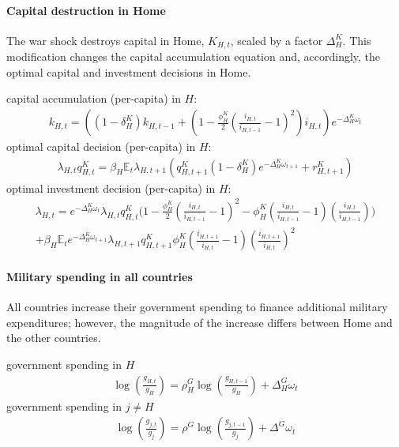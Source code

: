 \paragraph{Capital destruction in Home}
The war shock destroys capital in Home, \(K_{H,t}\), scaled by a factor \(\Delta^{K}_{H}\).
This modification changes the capital accumulation equation
  and, accordingly, the optimal capital and investment decisions in Home.
\begin{tcolorbox}[colback=lightGray, boxrule=1pt, center title, title=\textbf{Capital Destruction}]
capital accumulation (per-capita) in \(H\):
\begin{align*}
k_{H,t} = \left(
  (1-\delta^{K}_{H}) k_{H,t-1}
+ \left( 1 - \frac{\phi^{K}_{H}}{2} {\left(\frac{i_{H,t}}{i_{H,t-1}} - 1 \right)}^2 \right) i_{H,t}
\right) e^{-\Delta^{K}_{H} \omega_{t}}
\end{align*}
optimal capital decision (per-capita) in \(H\):
\begin{align*}
\lambda_{H,t} q^{K}_{H,t} = \beta_{H} \mathbb{E}_{t} \lambda_{H,t+1} \left( q^{K}_{H,t+1}(1-\delta^{K}_{H}) e^{-\Delta^{K}_{H} \omega_{t+1}} + r^{K}_{H,t+1} \right)
\end{align*}
optimal investment decision (per-capita) in \(H\):
\begin{multline*}
\lambda_{H,t} = e^{-\Delta^{K}_{H} \omega_{t}} \lambda_{H,t} q^{K}_{H,t}
\Bigg (
  1 - \frac{\phi^{K}_{H}}{2} {\left(\frac{i_{H,t}}{i_{H,t-1}}-1\right)}^2
  - \phi^{K}_{H} \left( \frac{i_{H,t}}{i_{H,t-1}} - 1 \right) \left(\frac{i_{H,t}}{i_{H,t-1}}\right)
\Bigg )
\\
+ \beta_{H} \mathbb{E}_{t} e^{-\Delta^{K}_{H} \omega_{t+1}} \lambda_{H,t+1} q^{K}_{H,t+1}
    \phi^{K}_{H} \left( \frac{i_{H,t+1}}{i_{H,t}} - 1\right)
    {\left(\frac{i_{H,t+1}}{i_{H,t}}\right)}^2
\end{multline*}
\end{tcolorbox}

\paragraph{Military spending in all countries}
All countries increase their government spending to finance additional military expenditures;
  however, the magnitude of the increase differs between Home and the other countries.
\begin{tcolorbox}[colback=lightGray, boxrule=1pt, center title, title=\textbf{Military Spending}]
government spending in \(H\)
\begin{align*}
\log\left(\frac{g_{H,t}}{g_{H}}\right) = \rho^{G}_{H} \log\left(\frac{g_{H,t-1}}{g_{H}}\right) + \Delta^{G}_{H} \omega_{t}
\end{align*}
government spending in \(j \neq H\)
\begin{align*}
\log\left(\frac{g_{j,t}}{g_{j}}\right) = \rho^{G} \log\left(\frac{g_{j,t-1}}{g_{j}}\right) + \Delta^{G} \omega_{t}
\end{align*}
\end{tcolorbox}

\newpage
\printbibliography%

